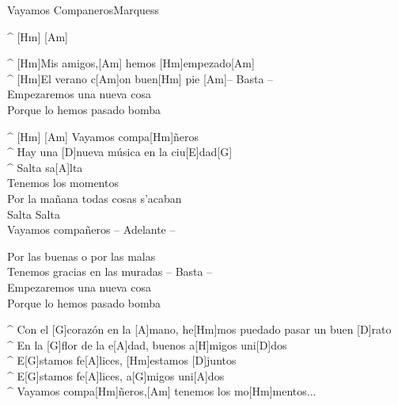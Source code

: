 \begin{song}{Vayamos Companeros}{Marquess}

\begin{guitar}
^ [Hm] [Am]\\

\end{guitar}
\begin{guitar}
^ [Hm]Mis amigos,[Am] hemos [Hm]empezado[Am]\\
^ [Hm]El verano c[Am]on buen[Hm] pie [Am]– Basta –\\
Empezaremos una nueva cosa\\
Porque lo hemos pasado bomba\\
\end{guitar}

\begin{guitar}
^ [Hm]   [Am]  Vayamos compa[Hm]ñeros\\
^ Hay una [D]nueva música en la ciu[E]dad[G]\\
^ Salta sa[A]lta\\
Tenemos los momentos\\
Por la mañana todas cosas s'acaban\\
Salta Salta\\
Vayamos compañeros – Adelante –\\
\end{guitar}

\begin{guitar}
Por las buenas o por las malas\\
Tenemos gracias en las muradas – Basta –\\
Empezaremos una nueva cosa\\
Porque lo hemos pasado bomba\\
\end{guitar}


\begin{guitar}
^ Con el [G]corazón en la [A]mano, he[Hm]mos puedado pasar un buen [D]rato\\
^ En la [G]flor de la e[A]dad, buenos a[H]migos uni[D]dos\\
^ E[G]stamos fe[A]lices, [Hm]estamos [D]juntos\\
^ E[G]stamos fe[A]lices, a[G]migos uni[A]dos\\
^   Vayamos compa[Hm]ñeros,[Am] tenemos los mo[Hm]mentos...\\
\end{guitar}


\end{song}
